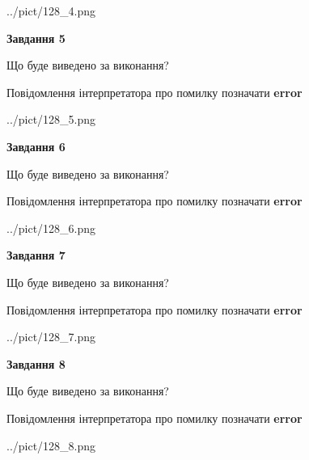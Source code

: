 \documentclass[12pt, ukrainian]{article}
\begin{document}
{\begin{center}
	{../pict/128_4.png}
\end{center}
\newpage

{\begin {center}\textbf{Завдання 5}\end {center}}\par
Що буде виведено за виконання? \par
Повідомлення інтерпретатора про помилку позначати \textbf{error}

\begin{center}
	{../pict/128_5.png}
\end{center}
\newpage

{\begin {center}\textbf{Завдання 6}\end {center}}\par
Що буде виведено за виконання? \par
Повідомлення інтерпретатора про помилку позначати \textbf{error}

\begin{center}
	{../pict/128_6.png}
\end{center}
\newpage

{\begin {center}\textbf{Завдання 7}\end {center}}\par
Що буде виведено за виконання? \par
Повідомлення інтерпретатора про помилку позначати \textbf{error}

\begin{center}
	{../pict/128_7.png}
\end{center}
\newpage

{\begin {center}\textbf{Завдання 8}\end {center}}\par
Що буде виведено за виконання? \par
Повідомлення інтерпретатора про помилку позначати \textbf{error}

\begin{center}
	{../pict/128_8.png}
\end{center}
\newpage

}
\end{document}
